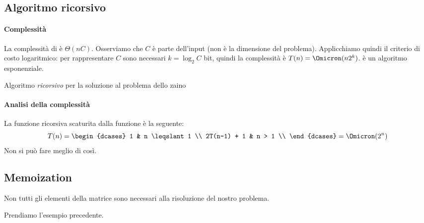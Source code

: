 \subsection{Algoritmo ricorsivo}

\paragraph{Complessità}
La complessità di \knapsack è \(\Theta(nC)\).
Osserviamo che \(C\) è parte dell'input (non è la dimensione del problema).
Applicchiamo quindi il criterio di costo logaritmico: per rappresentare \(C\) sono necessari \(k = \log_2 C\) bit, quindi la complessità è \(T(n) = \Omicron(n2^k)\). \knapsack è un algoritmo esponenziale.

\begin{algorithm}[H]
    \caption{Algoritmo \emph{ricorsivo} per la soluzione al problema dello zaino}
    
\end{algorithm}

\paragraph{Analisi della complessità}
La funzione ricorsiva scaturita dalla funzione \knapsack è la seguente:
\[
    T(n) =
    \begin{dcases}
        1           & n \leqslant 1 \\
        2T(n-1) + 1 & n > 1         \\
    \end{dcases}
    = \Omicron(2^n)
\]
Non si può fare meglio di così.

\subsection{Memoization}

\begin{note}
Non tutti gli elementi della matrice sono necessari alla risoluzione del nostro problema.
\end{note}

Prendiamo l'esempio precedente.


